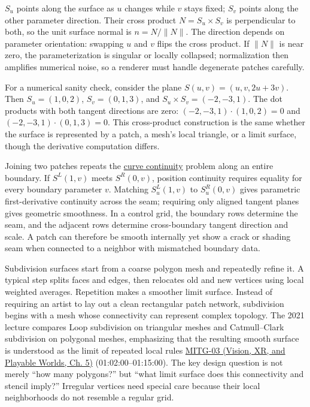 \(S_u\) points along the surface as \(u\) changes while \(v\) stays fixed; \(S_v\) points along the other parameter direction. Their cross product \(N=S_u\times S_v\) is perpendicular to both, so the unit surface normal is \(n=N/\|N\|\). The direction depends on parameter orientation: swapping \(u\) and \(v\) flips the cross product. If \(\|N\|\) is near zero, the parameterization is singular or locally collapsed; normalization then amplifies numerical noise, so a renderer must handle degenerate patches carefully.

For a numerical sanity check, consider the plane \(S(u,v)=(u,v,2u+3v)\). Then \(S_u=(1,0,2)\), \(S_v=(0,1,3)\), and \(S_u\times S_v=(-2,-3,1)\). The dot products with both tangent directions are zero: \((-2,-3,1)\cdot(1,0,2)=0\) and \((-2,-3,1)\cdot(0,1,3)=0\). This cross-product construction is the same whether the surface is represented by a patch, a mesh's local triangle, or a limit surface, though the derivative computation differs.

Joining two patches repeats the \hyperref[appendix-f28eeec97a3d]{curve continuity} problem along an entire boundary. If \(S^L(1,v)\) meets \(S^R(0,v)\), position continuity requires equality for every boundary parameter \(v\). Matching \(S^L_u(1,v)\) to \(S^R_u(0,v)\) gives parametric first-derivative continuity across the seam; requiring only aligned tangent planes gives geometric smoothness. In a control grid, the boundary rows determine the seam, and the adjacent rows determine cross-boundary tangent direction and scale. A patch can therefore be smooth internally yet show a crack or shading seam when connected to a neighbor with mismatched boundary data.

Subdivision surfaces start from a coarse polygon mesh and repeatedly refine it. A typical step splits faces and edges, then relocates old and new vertices using local weighted averages. Repetition makes a smoother limit surface. Instead of requiring an artist to lay out a clean rectangular patch network, subdivision begins with a mesh whose connectivity can represent complex topology. The 2021 lecture compares Loop subdivision on triangular meshes and Catmull--Clark subdivision on polygonal meshes, emphasizing that the resulting smooth surface is understood as the limit of repeated local rules \href{../07-Vision-XR-and-Playable-Worlds/main.pdf\#nameddest=04-visual-computing-ii-ch036-mitg-03---curves-and-surfaces}{MITG-03 (Vision, XR, and Playable Worlds, Ch. 5)} (01:02:00--01:15:00). The key design question is not merely ``how many polygons?'' but ``what limit surface does this connectivity and stencil imply?'' Irregular vertices need special care because their local neighborhoods do not resemble a regular grid.

